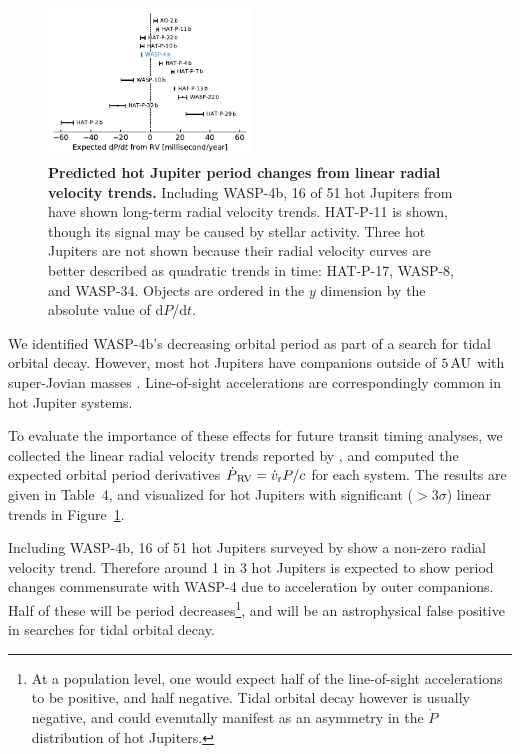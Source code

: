 \documentclass[12pt,twocolumn,tighten]{aastex62}
\begin{document}
\begin{figure}[t]
	\begin{center}
		\leavevmode
		\includegraphics[width=0.48\textwidth]{f5.pdf}
	\end{center}
	\vspace{-0.4cm}
	\caption{
  {\bf Predicted hot Jupiter period changes from linear radial
  velocity trends.} Including WASP-4b, 16 of 51 hot Jupiters from
  \citet{knutson_friends_2014} have shown long-term radial velocity
  trends.  HAT-P-11 is shown, though its signal may be caused
  by stellar activity.  Three hot Jupiters are not shown because
  their radial velocity curves are better described as quadratic
  trends in time: HAT-P-17, WASP-8, and WASP-34.  Objects are ordered
  in the $y$ dimension by the absolute value of d$P$/d$t$.
	\label{fig:pdot_pop}
  \vspace{-0.3cm}
	}
\end{figure}

We identified WASP-4b's decreasing orbital period as part of a search
for tidal orbital decay.  However, most hot Jupiters have companions
outside of $5\,{\rm AU}$ with super-Jovian masses
\citep{knutson_friends_2014,bryan_statistics_2016}.  Line-of-sight
accelerations are correspondingly common in hot Jupiter systems. 

To evaluate the importance of these effects for future transit timing
analyses, we collected the linear radial velocity trends reported by
\citet{knutson_friends_2014}, and computed the expected orbital period
derivatives $\dot{P}_{\rm\,RV} = \dot{v}_{\rm r} P/c$ for each system.
The results are given in Table~4, and visualized for hot Jupiters with
significant ($>$$3\sigma$) linear trends in Figure~\ref{fig:pdot_pop}.

Including WASP-4b, 16 of 51 hot Jupiters surveyed by
\citet{knutson_friends_2014} show a non-zero radial velocity trend.
Therefore around 1 in 3 hot Jupiters is expected to show period
changes commensurate with WASP-4 due to acceleration by outer
companions.  Half of these will be period decreases\footnote{ At a
population level, one would expect half of the line-of-sight
accelerations to be positive, and half negative.  Tidal orbital decay
however is usually negative, and could evenutally manifest as an asymmetry in the
$\dot{P}$ distribution of hot Jupiters.}, and will be an
astrophysical false positive in searches for tidal orbital decay.
\end{document}
